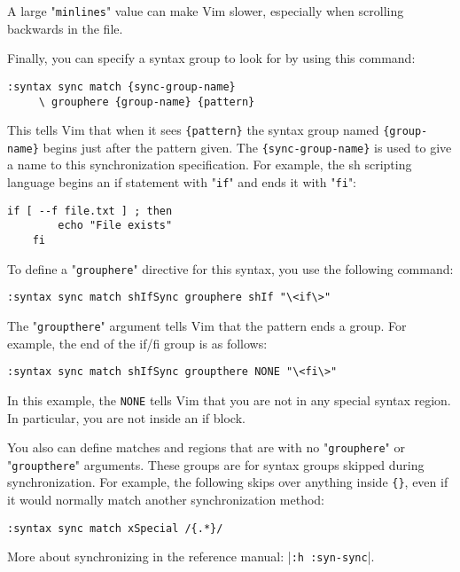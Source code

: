 A large "\verb!minlines!" value can make Vim slower, especially when scrolling backwards in the file.

Finally, you can specify a syntax group to look for by using this command:

\begin{Verbatim}[samepage=true]
 :syntax sync match {sync-group-name}
     \ grouphere {group-name} {pattern}
\end{Verbatim}

This tells Vim that when it sees \verb!{pattern}! the syntax group named \verb!{group-name}! begins just after the pattern given.
The \verb!{sync-group-name}! is used to give a name to this synchronization specification.
For example, the sh scripting language begins an if statement with "\verb!if!" and ends it with "\verb!fi!":

\begin{Verbatim}[samepage=true]
    if [ --f file.txt ] ; then 
        echo "File exists" 
    fi 
\end{Verbatim}

To define a "\verb!grouphere!" directive for this syntax, you use the following command:

\begin{Verbatim}[samepage=true]
 :syntax sync match shIfSync grouphere shIf "\<if\>"
\end{Verbatim}

The "\verb!groupthere!" argument tells Vim that the pattern ends a group.
For example, the end of the if/fi group is as follows:

\begin{Verbatim}[samepage=true]
 :syntax sync match shIfSync groupthere NONE "\<fi\>"
\end{Verbatim}

In this example, the \verb!NONE! tells Vim that you are not in any special syntax region.
In particular, you are not inside an if block.

You also can define matches and regions that are with no "\verb!grouphere!" or "\verb!groupthere!" arguments.
These groups are for syntax groups skipped during synchronization.
For example, the following skips over anything inside \verb!{}!, even if it would normally match another synchronization method:

\begin{Verbatim}[samepage=true]
 :syntax sync match xSpecial /{.*}/
\end{Verbatim}

More about synchronizing in the reference manual: |\verb!:h :syn-sync!|.
